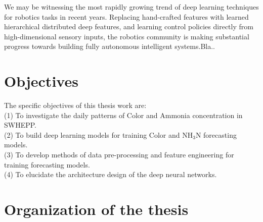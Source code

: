 We may be witnessing the most rapidly growing trend of deep learning techniques for robotics tasks in recent years.
Replacing hand-crafted features with learned hierarchical distributed deep features, and learning control policies directly from high-dimensional sensory inputs, the robotics community is making substantial progress towards building fully autonomous intelligent systems.Bla.\cite{chen_assessing_2003}.

\section{Objectives}
\noindent
The specific objectives of this thesis work are:\\
(1) To investigate the daily patterns of Color and Ammonia concentration in SWHEPP.\\
(2) To build deep learning models for training Color and NH$_{3}$N forecasting models.\\
(3) To develop methods of data pre-processing and feature engineering for training forecasting models.\\
(4) To elucidate the architecture design of the deep neural networks.

\section{Organization of the thesis}